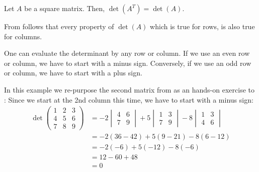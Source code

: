 \begin{thm}\label{thm-determinant-transposed}
	Let $A$ be a square matrix. Then, $\det(A^T)=\det(A)$.
\end{thm}

\begin{crl}\label{crl-determinant-row-col-properties}
	From  follows that every
	property of $\det(A)$ which is true for rows, is also true for columns.
\end{crl}

\begin{thm}\label{thm-determinant-row-col}
	One can evaluate the determinant by any row or column. If we use an even
	row or column, we have to start with a minus sign. Conversely, if we use an
	odd row or column, we have to start with a plus sign.
\end{thm}

\begin{exm}
	In this example we re-purpose the second matrix from 
	as an hands-on exercise to : Since we
	start at the 2nd column this time, we have to start with a minus sign:
	\begin{align*}
		\det\begin{pmatrix}
			1 & \boxed{2} & 3 \\
			4 & \boxed{5} & 6 \\
			7 & \boxed{8} & 9
		\end{pmatrix} & =-2\begin{vmatrix}
			4 & 6 \\
			7 & 9
		\end{vmatrix}+5\begin{vmatrix}
			1 & 3 \\
			7 & 9
		\end{vmatrix}-8\begin{vmatrix}
			1 & 3 \\
			4 & 6
		\end{vmatrix} \\
		                               & =-2(36-42)+5(9-21)-8(6-12)                                                            \\
		                               & =-2(-6)+5(-12)-8(-6)                                                                  \\
		                               & =12-60+48                                                                             \\
		                               & =0
	\end{align*}
\end{exm}

